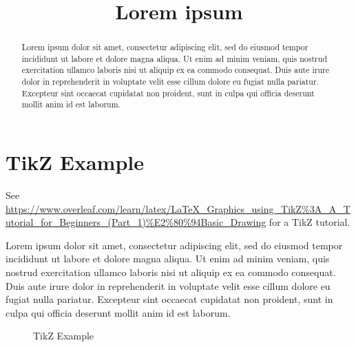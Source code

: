 \documentclass{article}
\begin{document}
\title{Lorem ipsum}

\maketitle

\begin{abstract}
  Lorem ipsum dolor sit amet, consectetur adipiscing elit, sed do eiusmod tempor incididunt ut labore et dolore magna aliqua. Ut enim ad minim veniam, quis nostrud exercitation ullamco laboris nisi ut aliquip ex ea commodo consequat. Duis aute irure dolor in reprehenderit in voluptate velit esse cillum dolore eu fugiat nulla pariatur. Excepteur sint occaecat cupidatat non proident, sunt in culpa qui officia deserunt mollit anim id est laborum.
\end{abstract}


\section{TikZ Example}

See \url{https://www.overleaf.com/learn/latex/LaTeX_Graphics_using_TikZ%3A_A_Tutorial_for_Beginners_(Part_1)%E2%80%94Basic_Drawing} for a TikZ tutorial.

Lorem ipsum dolor sit amet, consectetur adipiscing elit, sed do eiusmod tempor incididunt ut labore et dolore magna aliqua. Ut enim ad minim veniam, quis nostrud exercitation ullamco laboris nisi ut aliquip ex ea commodo consequat. Duis aute irure dolor in reprehenderit in voluptate velit esse cillum dolore eu fugiat nulla pariatur. Excepteur sint occaecat cupidatat non proident, sunt in culpa qui officia deserunt mollit anim id est laborum.

\begin{figure}[htb]
  \centering
\caption{TikZ Example}
\end{figure}
\end{document}
